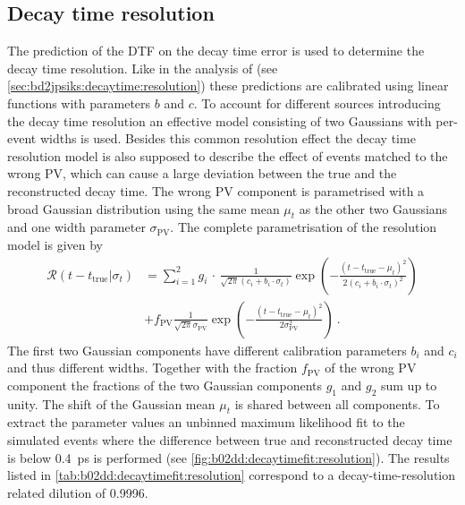 \subsection{Decay time resolution}
\label{sec:b02dd:decaytimefit:resolution}

The prediction of the DTF on the decay time error is used to determine the
decay time resolution. Like in the analysis of \BdToJPsiKS (see
\cref{sec:bd2jpsiks:decaytime:resolution}) these predictions are calibrated
using linear functions with parameters $b$ and $c$. To account for different sources
introducing the decay time resolution an effective model consisting of two
Gaussians with per-event widths is used. Besides this common resolution effect
the decay time resolution model is also supposed to describe the effect of
events matched to the wrong PV, which can cause a large deviation between the
true and the reconstructed decay time. The wrong PV component is
parametrised with a broad Gaussian distribution using the same mean $\mu_t$ as
the other two Gaussians and one width parameter $\sigma_{\text{PV}}$. The
complete parametrisation of the resolution model is given by
%
\begin{equation}
\begin{split}
  {\mathcal{R}}(t-t_\text{true}|\sigma_t) &= \sum_{i=1}^{2}{g_i\,\cdot\,\frac{1}{\sqrt{2\pi}(c_i + b_i \cdot \sigma_t)}\exp\left(-\frac{(t - t_\text{true} - \mu_t)^2}{2(c_i + b_i \cdot \sigma_t)^2}\right)}\\
  &+ f_{\text{PV}} \frac{1}{\sqrt{2\pi} \sigma_{\text{PV}}} \exp\left(-\frac{(t - t_\text{true} - \mu_t)^2}{2 \sigma_{\text{PV}}^2}\right) \ .
\label{eq:b02dd:decaytimefit:resolution}
\end{split}
\end{equation}
%
The first two Gaussian components have different calibration parameters $b_i$
and $c_i$ and thus different widths. Together with the fraction $f_\text{PV}$
of the wrong PV component the fractions of the two Gaussian components $g_1$
and $g_2$ sum up to unity. The shift of the Gaussian mean $\mu_t$ is shared
between all components. To extract the parameter values an unbinned maximum
likelihood fit to the simulated events where the difference between true and
reconstructed decay time is below \SI{0.4}{\ps} is performed (see
\cref{fig:b02dd:decaytimefit:resolution}). The results listed in
\cref{tab:b02dd:decaytimefit:resolution} correspond to a decay-time-resolution
related dilution of \num{0.9996}.
%
